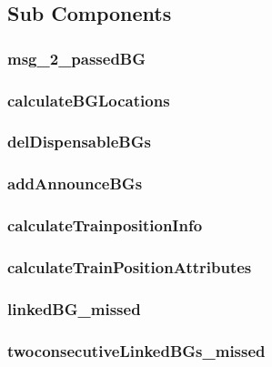\subsection{Sub Components}\label{s:calculateTrainPosition_subcomponents}

\subsubsection{msg\_2\_passedBG}


\subsubsection{calculateBGLocations}


\subsubsection{delDispensableBGs}


\subsubsection{addAnnounceBGs}


\subsubsection{calculateTrainpositionInfo}


\subsubsection{calculateTrainPositionAttributes}


\subsubsection{linkedBG\_missed}


\subsubsection{twoconsecutiveLinkedBGs\_missed}







